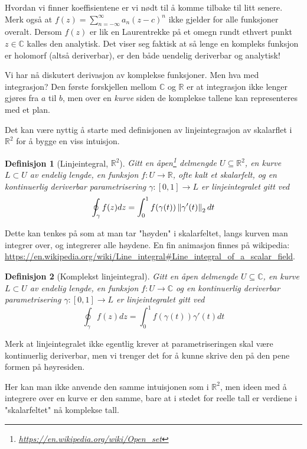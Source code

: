 \documentclass{article}
\newtheorem{definition}{Definisjon}
\begin{document}
Hvordan vi finner koeffisientene er vi nødt til å komme tilbake til litt senere. Merk også at $f(z) = \sum_{n=-\infty}^\infty a_n (z - c)^n$ ikke gjelder for alle funksjoner overalt. Dersom $f(z)$ er lik en Laurentrekke på et omegn rundt ethvert punkt $z \in \mathbb{C}$ kalles den analytisk. Det viser seg faktisk at så lenge en kompleks funksjon er holomorf (altså deriverbar), er den både uendelig deriverbar og analytisk!

Vi har nå diskutert derivasjon av komplekse funksjoner. Men hva med integrasjon? Den første forskjellen mellom $\mathbb{C}$ og $\mathbb{R}$ er at integrasjon ikke lenger gjøres fra $a$ til $b$, men over en \textit{kurve} siden de komplekse tallene kan representeres med et plan.

Det kan være nyttig å starte med definisjonen av linjeintegrasjon av skalarflet i $\mathbb{R}^2$ for å bygge en viss intuisjon.

\begin{definition}[Linjeintegral, $\mathbb{R}^2$]
    Gitt en åpen\footnote{\url{https://en.wikipedia.org/wiki/Open_set}} delmengde $U \subseteq \mathbb{R}^2$, en kurve $L \subset U$ av endelig lengde, en funksjon $f:U \longrightarrow \mathbb{R}$, ofte kalt et skalarfelt, og en kontinuerlig deriverbar parametrisering $\gamma : [0, 1] \longrightarrow L$ er linjeintegralet gitt ved \[
        \oint_\gamma f(z)dz = \int_0^1 f(\gamma(t)) \left\lVert\gamma'(t)\right\rVert_2 dt
    \]
\end{definition}

Dette kan tenkes på som at man tar "høyden" i skalarfeltet, langs kurven man integrer over, og integrerer alle høydene. En fin animasjon finnes på wikipedia: \url{https://en.wikipedia.org/wiki/Line_integral#Line_integral_of_a_scalar_field}.

\begin{definition}[Komplekst linjeintegral]
    Gitt en åpen delmengde $U \subseteq \mathbb{C}$, en kurve $L \subset U$ av endelig lengde, en funksjon $f:U \longrightarrow \mathbb{C}$ og en kontinuerlig deriverbar parametrisering $\gamma : [0, 1] \longrightarrow L$ er linjeintegralet gitt ved \[
        \oint_\gamma f(z)dz = \int_0^1 f(\gamma(t)) \gamma'(t) dt
    \]
\end{definition}

Merk at linjeintegralet ikke egentlig krever at parametriseringen skal være kontinuerlig deriverbar, men vi trenger det for å kunne skrive den på den pene formen på høyresiden.

Her kan man ikke anvende den samme intuisjonen som i $\mathbb{R}^2$, men ideen med å integrere over en kurve er den samme, bare at i stedet for reelle tall er verdiene i "skalarfeltet" nå komplekse tall.
\end{document}
